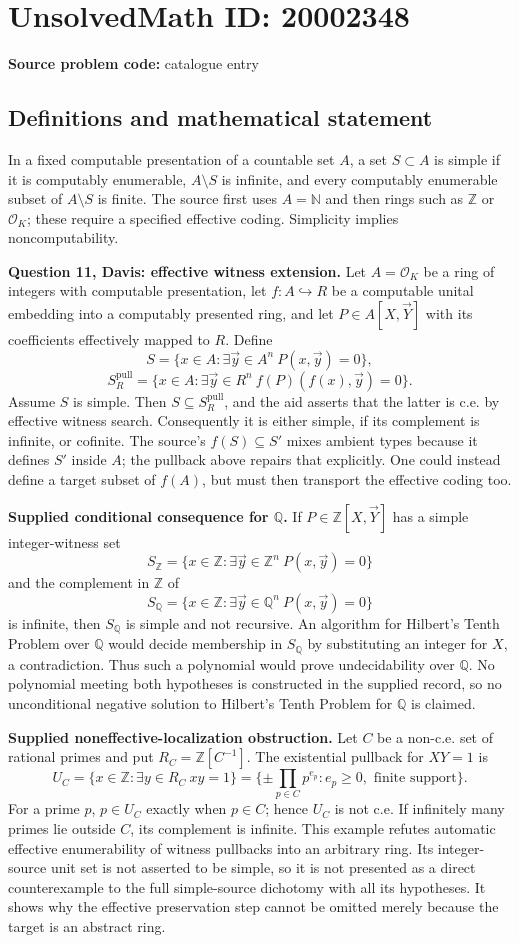 \documentclass[11pt]{article}
\newcommand{\N}{\mathbb{N}}
\newcommand{\Z}{\mathbb{Z}}
\newcommand{\Q}{\mathbb{Q}}
\begin{document}
\section*{UnsolvedMath ID: 20002348}
\textbf{Source problem code:} catalogue entry
\subsection{Definitions and mathematical statement}
In a fixed computable presentation of a countable set $A$, a set $S\subset A$ is simple if it is computably enumerable, $A\setminus S$ is infinite, and every computably enumerable subset of $A\setminus S$ is finite. The source first uses $A=\N$ and then rings such as $\Z$ or $\mathcal O_K$; these require a specified effective coding. Simplicity implies noncomputability.

\textbf{Question 11, Davis: effective witness extension.} Let $A=\mathcal O_K$ be a ring of integers with computable presentation, let $f:A\hookrightarrow R$ be a computable unital embedding into a computably presented ring, and let $P\in A[X,\vec Y]$ with its coefficients effectively mapped to $R$. Define
\[
 S=\{x\in A:\exists\vec y\in A^n\ P(x,\vec y)=0\},
\]
\[
 S_R^{\mathrm{pull}}=\{x\in A:\exists\vec y\in R^n\
                        f(P)(f(x),\vec y)=0\}.
\]
Assume $S$ is simple. Then $S\subseteq S_R^{\mathrm{pull}}$, and the aid asserts that the latter is c.e. by effective witness search. Consequently it is either simple, if its complement is infinite, or cofinite. The source's $f(S)\subseteq S'$ mixes ambient types because it defines $S'$ inside $A$; the pullback above repairs that explicitly. One could instead define a target subset of $f(A)$, but must then transport the effective coding too.

\textbf{Supplied conditional consequence for $\Q$.} If $P\in\Z[X,\vec Y]$ has a simple integer-witness set
\[
 S_\Z=\{x\in\Z:\exists\vec y\in\Z^n\ P(x,\vec y)=0\}
\]
and the complement in $\Z$ of
\[
 S_\Q=\{x\in\Z:\exists\vec y\in\Q^n\ P(x,\vec y)=0\}
\]
is infinite, then $S_\Q$ is simple and not recursive. An algorithm for Hilbert's Tenth Problem over $\Q$ would decide membership in $S_\Q$ by substituting an integer for $X$, a contradiction. Thus such a polynomial would prove undecidability over $\Q$. No polynomial meeting both hypotheses is constructed in the supplied record, so no unconditional negative solution to Hilbert's Tenth Problem for $\Q$ is claimed.

\textbf{Supplied noneffective-localization obstruction.} Let $C$ be a non-c.e. set of rational primes and put $R_C=\Z[C^{-1}]$. The existential pullback for $XY=1$ is
\[
 U_C=\{x\in\Z:\exists y\in R_C\ xy=1\}
     =\{\pm\textstyle\prod_{p\in C}p^{e_p}:e_p\ge0,
                                      \text{ finite support}\}.
\]
For a prime $p$, $p\in U_C$ exactly when $p\in C$; hence $U_C$ is not c.e. If infinitely many primes lie outside $C$, its complement is infinite. This example refutes automatic effective enumerability of witness pullbacks into an arbitrary ring. Its integer-source unit set is not asserted to be simple, so it is not presented as a direct counterexample to the full simple-source dichotomy with all its hypotheses. It shows why the effective preservation step cannot be omitted merely because the target is an abstract ring.
\end{document}
